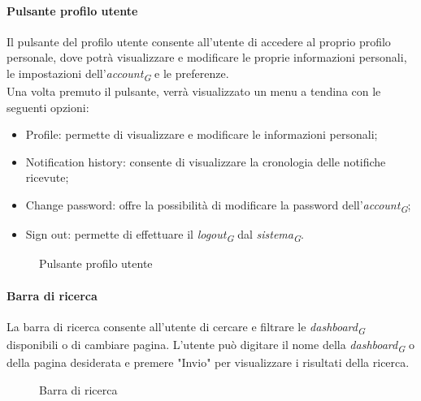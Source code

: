 \paragraph{Pulsante profilo utente}
\hypertarget{par:pulsante_profilo}{}
Il pulsante del profilo utente consente all'utente di accedere al proprio profilo personale, dove potrà visualizzare e modificare le proprie informazioni personali, le impostazioni dell'\textit{account}\textsubscript{\textit{G}} e le preferenze. \\
Una volta premuto il pulsante, verrà visualizzato un menu a tendina con le seguenti opzioni:
\begin{itemize}
    \item Profile: permette di visualizzare e modificare le informazioni personali;
    \item Notification history: consente di visualizzare la cronologia delle notifiche ricevute;
    \item Change password: offre la possibilità di modificare la password dell'\textit{account}\textsubscript{\textit{G}};
    \item Sign out: permette di effettuare il \textit{logout}\textsubscript{\textit{G}} dal \textit{sistema}\textsubscript{\textit{G}}.
\end{itemize}
\begin{figure}[H]
    \centering
    \caption{Pulsante profilo utente}
    \label{fig:my_label}
\end{figure}


\paragraph{Barra di ricerca}
La barra di ricerca consente all'utente di cercare e filtrare le \textit{dashboard}\textsubscript{\textit{G}} disponibili o di cambiare pagina. L'utente può digitare il nome della \textit{dashboard}\textsubscript{\textit{G}} o della pagina desiderata e premere "Invio" per visualizzare i risultati della ricerca.  
\begin{figure}[H]
    \centering
    \caption{Barra di ricerca}
    \label{fig:my_label}
\end{figure}

